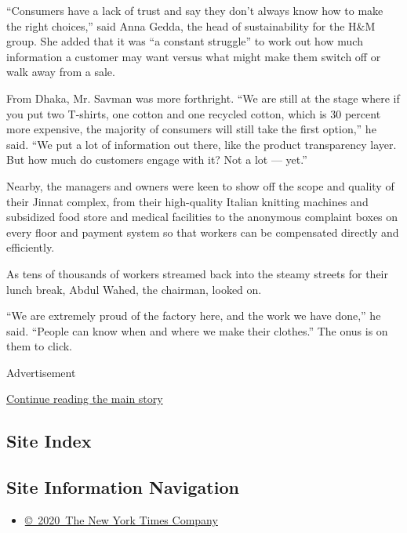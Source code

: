 ``Consumers have a lack of trust and say they don't always know how to
make the right choices,'' said Anna Gedda, the head of sustainability
for the H\&M group. She added that it was ``a constant struggle'' to
work out how much information a customer may want versus what might make
them switch off or walk away from a sale.

From Dhaka, Mr. Savman was more forthright. ``We are still at the stage
where if you put two T-shirts, one cotton and one recycled cotton, which
is 30 percent more expensive, the majority of consumers will still take
the first option,'' he said. ``We put a lot of information out there,
like the product transparency layer. But how much do customers engage
with it? Not a lot --- yet.''

Nearby, the managers and owners were keen to show off the scope and
quality of their Jinnat complex, from their high-quality Italian
knitting machines and subsidized food store and medical facilities to
the anonymous complaint boxes on every floor and payment system so that
workers can be compensated directly and efficiently.

As tens of thousands of workers streamed back into the steamy streets
for their lunch break, Abdul Wahed, the chairman, looked on.

``We are extremely proud of the factory here, and the work we have
done,'' he said. ``People can know when and where we make their
clothes.'' The onus is on them to click.

Advertisement

\protect\hyperlink{after-bottom}{Continue reading the main story}

\hypertarget{site-index}{%
\subsection{Site Index}\label{site-index}}

\hypertarget{site-information-navigation}{%
\subsection{Site Information
Navigation}\label{site-information-navigation}}

\begin{itemize}
\tightlist
\item
  \href{https://help.nytimes.com/hc/en-us/articles/115014792127-Copyright-notice}{©~2020~The
  New York Times Company}
\end{itemize}

